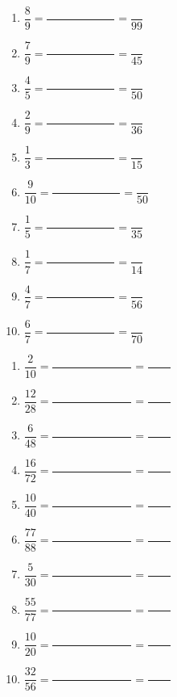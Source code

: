 \documentclass[a4paper,11pt,fleqn]{article}
\begin{document}
\newpage
{}

\begin{multicols}{2}
\begin{enumerate}[itemsep=2em]
	\item $ \dfrac{8}{9} = \dfrac{\phantom{000000000000}}{\phantom{000000000000}} = \dfrac{}{99} $
	\item $ \dfrac{7}{9} = \dfrac{\phantom{000000000000}}{\phantom{000000000000}} = \dfrac{}{45} $
	\item $ \dfrac{4}{5} = \dfrac{\phantom{000000000000}}{\phantom{000000000000}} = \dfrac{}{50} $
	\item $ \dfrac{2}{9} = \dfrac{\phantom{000000000000}}{\phantom{000000000000}} = \dfrac{}{36} $
	\item $ \dfrac{1}{3} = \dfrac{\phantom{000000000000}}{\phantom{000000000000}} = \dfrac{}{15} $
	\item $ \dfrac{9}{10} = \dfrac{\phantom{000000000000}}{\phantom{000000000000}} = \dfrac{}{50} $
	\item $ \dfrac{1}{5} = \dfrac{\phantom{000000000000}}{\phantom{000000000000}} = \dfrac{}{35} $
	\item $ \dfrac{1}{7} = \dfrac{\phantom{000000000000}}{\phantom{000000000000}} = \dfrac{}{14} $
	\item $ \dfrac{4}{7} = \dfrac{\phantom{000000000000}}{\phantom{000000000000}} = \dfrac{}{56} $
	\item $ \dfrac{6}{7} = \dfrac{\phantom{000000000000}}{\phantom{000000000000}} = \dfrac{}{70} $
\end{enumerate}
\end{multicols}


\begin{multicols}{2}
\begin{enumerate}[itemsep=2em]
	\item $ \dfrac{2}{10} = \dfrac{\phantom{00000000000000}}{} = \dfrac{\phantom{0000}}{} $
	\item $ \dfrac{12}{28} = \dfrac{\phantom{00000000000000}}{} = \dfrac{\phantom{0000}}{} $
	\item $ \dfrac{6}{48} = \dfrac{\phantom{00000000000000}}{} = \dfrac{\phantom{0000}}{} $
	\item $ \dfrac{16}{72} = \dfrac{\phantom{00000000000000}}{} = \dfrac{\phantom{0000}}{} $
	\item $ \dfrac{10}{40} = \dfrac{\phantom{00000000000000}}{} = \dfrac{\phantom{0000}}{} $
	\item $ \dfrac{77}{88} = \dfrac{\phantom{00000000000000}}{} = \dfrac{\phantom{0000}}{} $
	\item $ \dfrac{5}{30} = \dfrac{\phantom{00000000000000}}{} = \dfrac{\phantom{0000}}{} $
	\item $ \dfrac{55}{77} = \dfrac{\phantom{00000000000000}}{} = \dfrac{\phantom{0000}}{} $
	\item $ \dfrac{10}{20} = \dfrac{\phantom{00000000000000}}{} = \dfrac{\phantom{0000}}{} $
	\item $ \dfrac{32}{56} = \dfrac{\phantom{00000000000000}}{} = \dfrac{\phantom{0000}}{} $
\end{enumerate}
\end{multicols}
\end{document}
